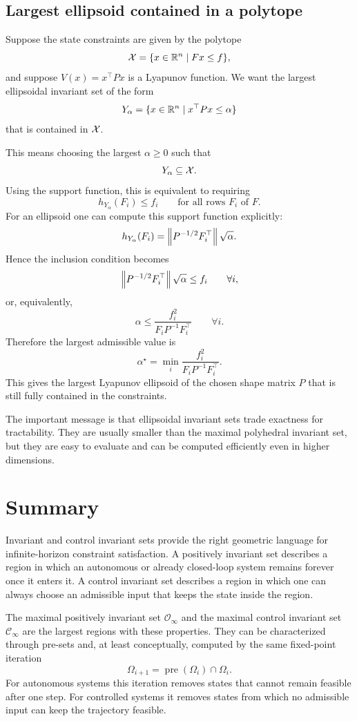 \subsection{Largest ellipsoid contained in a polytope}

Suppose the state constraints are given by the polytope
\[
\mathcal{X}=\{x\in \mathbb{R}^n \mid Fx\leq f\},
\]
and suppose \(V(x)=x^\top P x\) is a Lyapunov function. We want the largest ellipsoidal invariant
set of the form
\[
Y_\alpha=\{x\in \mathbb{R}^n \mid x^\top P x\leq \alpha\}
\]
that is contained in \(\mathcal{X}\).

This means choosing the largest \(\alpha\geq 0\) such that
\[
Y_\alpha \subseteq \mathcal{X}.
\]
Using the support function, this is equivalent to requiring
\[
h_{Y_\alpha}(F_i)\leq f_i
\qquad \text{for all rows } F_i \text{ of } F.
\]
For an ellipsoid one can compute this support function explicitly:
\[
h_{Y_\alpha}(F_i)=\left\lVert P^{-1/2}F_i^\top \right\rVert\sqrt{\alpha}.
\]
Hence the inclusion condition becomes
\[
\left\lVert P^{-1/2}F_i^\top \right\rVert\sqrt{\alpha}\leq f_i
\qquad \forall i,
\]
or, equivalently,
\[
\alpha \leq \frac{f_i^2}{F_i P^{-1}F_i^\top}
\qquad \forall i.
\]
Therefore the largest admissible value is
\[
\alpha^\star
=
\min_{i}
\frac{f_i^2}{F_i P^{-1}F_i^\top}.
\]
This gives the largest Lyapunov ellipsoid of the chosen shape matrix \(P\) that is still fully
contained in the constraints.

The important message is that ellipsoidal invariant sets trade exactness for tractability. They are
usually smaller than the maximal polyhedral invariant set, but they are easy to evaluate and can be
computed efficiently even in higher dimensions.

\section{Summary}

Invariant and control invariant sets provide the right geometric language for infinite-horizon
constraint satisfaction. A positively invariant set describes a region in which an autonomous or
already closed-loop system remains forever once it enters it. A control invariant set describes a
region in which one can always choose an admissible input that keeps the state inside the region.

The maximal positively invariant set \(\mathcal O_\infty\) and the maximal control invariant set
\(\mathcal C_\infty\) are the largest regions with these properties. They can be characterized through
pre-sets and, at least conceptually, computed by the same fixed-point iteration
\[
\Omega_{i+1}=\operatorname{pre}(\Omega_i)\cap \Omega_i.
\]
For autonomous systems this iteration removes states that cannot remain feasible after one step.
For controlled systems it removes states from which no admissible input can keep the trajectory
feasible.

